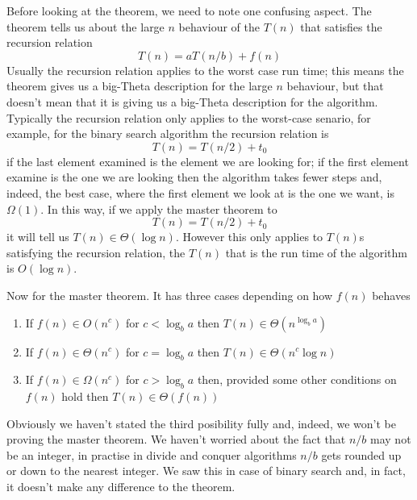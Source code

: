 \documentclass[11pt,a4paper]{scrartcl}
\begin{document}
Before looking at the theorem, we need to note one confusing
aspect. The theorem tells us about the large $n$ behaviour of the $T(n)$ that
satisfies the recursion relation
\begin{equation}
T(n)=aT(n/b)+f(n)
\end{equation}
Usually the recursion relation applies to the worst case run time;
this means the theorem gives us a big-Theta description for the large
$n$ behaviour, but that doesn't mean that it is giving us a big-Theta
description for the algorithm. Typically the recursion relation only
applies to the worst-case senario, for example, for the binary search
algorithm the recursion relation is 
\begin{equation}
T(n)=T(n/2)+t_0
\end{equation}
if the last element examined is the element we are looking for; if the
first element examine is the one we are looking then the algorithm
takes fewer steps and, indeed, the best case, where the first element
we look at is the one we want, is $\Omega(1)$. In this way, if we
apply the master theorem to 
\begin{equation}
T(n)=T(n/2)+t_0
\end{equation}
it will tell us $T(n)\in \Theta(\log{n})$. However this only applies
to $T(n)$s satisfying the recursion relation, the $T(n)$ that is the
run time of the algorithm is $O(\log{n})$.

Now for the master theorem. It has three cases depending on how $f(n)$ behaves
\begin{enumerate}
\item If $f(n) \in O(n^c)$ for $c<\log_ba$ then $T(n) \in \Theta(n^{\log_ba})$
\item If $f(n) \in \Theta(n^c)$ for $c=\log_ba$ then $T(n) \in \Theta(n^c\log n)$
\item If $f(n) \in \Omega(n^c)$ for $c>\log_ba$ then, provided some other conditions on $f(n)$ hold then $T(n)\in \Theta(f(n))$ 
\end{enumerate}
Obviously we haven't stated the third posibility fully and, indeed, we
won't be proving the master theorem. We haven't worried about the fact
that $n/b$ may not be an integer, in practise in divide and conquer
algorithms $n/b$ gets rounded up or down to the nearest integer. We
saw this in case of binary search and, in fact, it doesn't make any
difference to the theorem.
\end{document}
